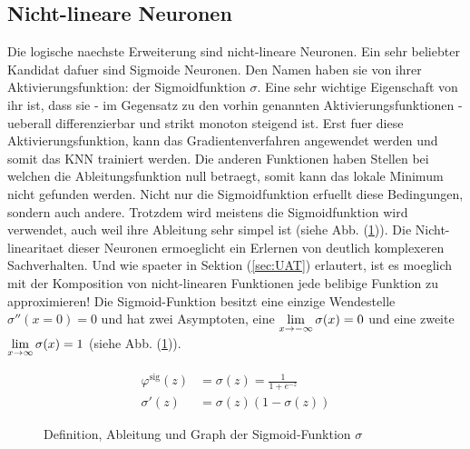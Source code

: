 \subsection{Nicht-lineare Neuronen}
Die logische naechste Erweiterung sind nicht-lineare Neuronen.
Ein sehr beliebter Kandidat dafuer sind Sigmoide Neuronen.
Den Namen haben sie von ihrer Aktivierungsfunktion: der Sigmoidfunktion $\sigma$.
Eine sehr wichtige Eigenschaft von ihr ist, dass sie - im Gegensatz zu den vorhin
genannten Aktivierungsfunktionen - ueberall differenzierbar und strikt monoton
steigend ist. Erst fuer diese Aktivierungsfunktion, kann das Gradientenverfahren
angewendet werden und somit das KNN trainiert werden. Die anderen
Funktionen haben Stellen bei welchen die Ableitungsfunktion null
betraegt, somit kann das lokale Minimum nicht gefunden werden.
\para{}
Nicht nur die Sigmoidfunktion erfuellt diese Bedingungen, sondern auch andere.
Trotzdem wird meistens die Sigmoidfunktion wird
verwendet, auch weil ihre Ableitung sehr simpel ist (siehe Abb. (\ref{fig:sigmoid})).
Die Nicht-linearitaet dieser Neuronen ermoeglicht ein Erlernen von deutlich komplexeren Sachverhalten.
Und wie spaeter in Sektion (\ref{sec:UAT}) erlautert, ist es moeglich mit der Komposition von nicht-linearen
Funktionen jede belibige Funktion zu approximieren!
\para{}
Die Sigmoid-Funktion besitzt eine einzige Wendestelle $\sigma''(x=0)=0$ und hat
zwei Asymptoten, eine $\displaystyle\lim_{x \to -\infty} \sigma(x)=0$
und eine zweite $\displaystyle\lim_{x \to \infty} \sigma(x)=1$ (siehe Abb. (\ref{fig:sigmoid})).
\\
\begin{figure}[h!]
  \begin{minipage}[h!]{0.5\textwidth}
    \begin{align*}
      \varphi^{\text{sig}}(z) &= \sigma(z) = \frac{1}{1 + e^{-z}}\\
      \sigma'(z)&=\sigma(z)(1-\sigma(z))
    \end{align*}
  \end{minipage}
  \begin{minipage}[h!]{0.5\textwidth}
    \centering
  \end{minipage}
  \caption{Definition, Ableitung und Graph der Sigmoid-Funktion $\sigma$}
  \label{fig:sigmoid}
\end{figure}


